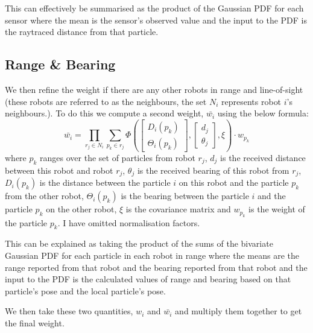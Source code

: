 \documentclass[a4paper, 10pt, conference]{ieeeconf}      %
\begin{document}
This can effectively be summarised as the product of the Gaussian PDF for each sensor where the mean is the sensor's observed value and the input to the PDF is the raytraced distance from that particle.
\subsection{Range \& Bearing}
We then refine the weight if there are any other robots in range and line-of-sight (these robots are referred to as the neighbours, the set $N_i$ represents robot $i$'s neighbours.). To do this we compute a second weight, $\bar{w_i}$ using the below formula:
\[
	\bar{w_i} = \prod_{r_j \in N_i}\sum_{p_k \in r_j}\Phi\left(
	\begin{bmatrix}
		D_i(p_k)\\
		\Theta_i(p_k)
	\end{bmatrix},
	\begin{bmatrix}
		d_j\\
		\theta_j
	\end{bmatrix},
	\xi
	\right)\cdot w_{p_k}
\]
where $p_k$ ranges over the set of particles from robot $r_j$, $d_j$ is the received distance between this robot and robot $r_j$, $\theta_j$ is the received bearing of this robot from $r_j$, $D_i(p_k)$ is the distance between the particle $i$ on this robot and the particle $p_k$ from the other robot, $\Theta_i(p_k)$ is the bearing between the particle $i$ and the particle $p_k$ on the other robot, $\xi$ is the covariance matrix and $w_{p_k}$ is the weight of the particle $p_k$. I have omitted normalisation factors.

This can be explained as taking the product of the sums of the bivariate Gaussian PDF for each particle in each robot in range where the means are the range reported from that robot and the bearing reported from that robot and the input to the PDF is the calculated values of range and bearing based on that particle's pose and the local particle's pose.

We then take these two quantities, $w_i$ and $\bar{w_i}$ and multiply them together to get the final weight.
\end{document}
